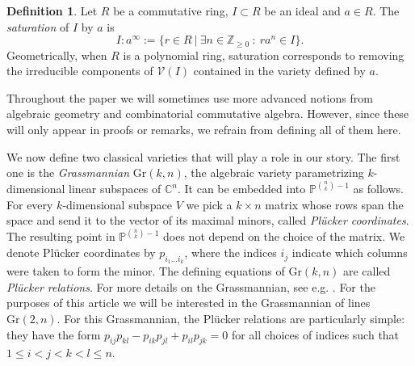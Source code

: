 \documentclass[12pt, reqno]{amsart}
\numberwithin{equation}{section}
\theoremstyle{plain}
\theoremstyle{definition}
\newtheorem{definition}[theorem]{Definition}
\begin{document}
\begin{definition}
    Let $R$ be a commutative ring, $I\subset R$ be an ideal and $a\in R$. The \emph{saturation} of $I$ by $a$ is
    $$I:a^\infty := \{r\in R\ |\ \exists n\in\mathbb{Z}_{\geq 0}\ :\ ra^n\in I \}.$$
    Geometrically, when $R$ is a polynomial ring, saturation corresponds to removing the irreducible components of $\mathcal{V}(I)$ contained in the variety defined by $a$.
\end{definition}

Throughout the paper we will sometimes use more advanced notions from algebraic geometry and combinatorial commutative algebra. However, since these will only appear in proofs or remarks, we refrain from defining all of them here.  

We now define two classical varieties that will play a role in our story. 
The first one is the \emph{Grassmannian} $\mathrm{Gr}(k,n)$, the algebraic variety parametrizing $k$-dimensional linear subspaces of $\mathbb{C}^n$. It can be embedded into $\mathbb{P}^{\binom{n}{k}-1}$ as follows. For every $k$-dimensional subspace $V$ we pick a $k\times n$ matrix whose rows span the space and send it to the vector of its maximal minors, called \emph{Pl\"ucker coordinates}. The resulting point in $\mathbb{P}^{\binom{n}{k}-1}$ does not depend on the choice of the matrix. We denote Pl\"ucker coordinates by $p_{i_1\ldots i_k}$, where the indices $i_j$ indicate which columns were taken to form the minor. The defining equations of $\mathrm{Gr}(k,n)$ are called \emph{Pl\"ucker relations}. For more details on the Grassmannian, see e.g. \cite[Chapter 5]{michalek2021invitation}. For the purposes of this article we will be interested in the Grassmannian of lines $\mathrm{Gr}(2,n)$. For this Grassmannian, the Pl\"ucker relations are particularly simple: they have the form $p_{ij}p_{kl}-p_{ik}p_{jl}+p_{il}p_{jk}=0$ for all choices of indices such that $1\leq i < j<k<l\leq n$. 
\end{document}
